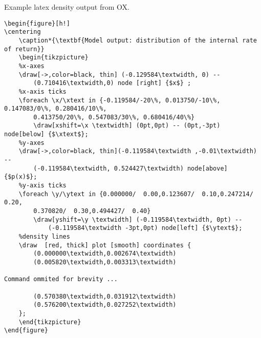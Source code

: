 \documentclass[notitlepage,a4paper]{article}
\begin{document}
Example latex density output from OX.
\begin{verbatim}
\begin{figure}[h!]
\centering
    \caption*{\textbf{Model output: distribution of the internal rate of return}}
    \begin{tikzpicture}
    %x-axes
    \draw[->,color=black, thin] (-0.129584\textwidth, 0) --
        (0.710416\textwidth,0) node [right] {$x$} ;
    %x-axis ticks
    \foreach \x/\xtext in {-0.119584/-20\%, 0.013750/-10\%, 0.147083/0\%, 0.280416/10\%,
        0.413750/20\%, 0.547083/30\%, 0.680416/40\%}
        \draw[xshift=\x \textwidth] (0pt,0pt) -- (0pt,-3pt) node[below] {$\xtext$};
    %y-axes
    \draw[->,color=black, thin](-0.119584\textwidth ,-0.01\textwidth) --
        (-0.119584\textwidth, 0.524427\textwidth) node[above] {$p(x)$};
    %y-axis ticks
    \foreach \y/\ytext in {0.000000/  0.00,0.123607/  0.10,0.247214/  0.20,
        0.370820/  0.30,0.494427/  0.40}
        \draw[yshift=\y \textwidth] (-0.119584\textwidth, 0pt) --
            (-0.119584\textwidth -3pt,0pt) node[left] {$\ytext$};
    %density lines
    \draw  [red, thick] plot [smooth] coordinates {
        (0.000000\textwidth,0.002674\textwidth)
        (0.005820\textwidth,0.003313\textwidth)

Command ommited for brevity ...

        (0.570380\textwidth,0.031912\textwidth)
        (0.576200\textwidth,0.027252\textwidth)
    };
    \end{tikzpicture}
\end{figure}
\end{verbatim}
\end{document}
